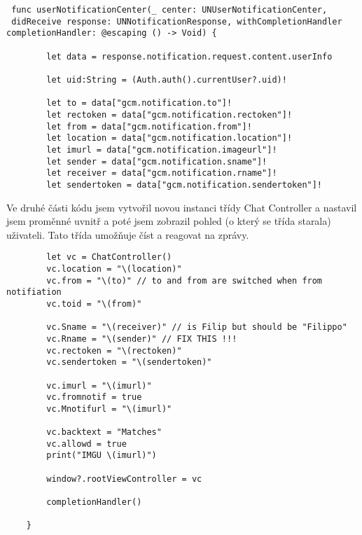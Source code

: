 \documentclass{article}
\begin{document}
\vspace{10 mm}
\begin{verbatim}
 func userNotificationCenter(_ center: UNUserNotificationCenter,
 didReceive response: UNNotificationResponse, withCompletionHandler completionHandler: @escaping () -> Void) {
       
        let data = response.notification.request.content.userInfo
        
        let uid:String = (Auth.auth().currentUser?.uid)!
        
        let to = data["gcm.notification.to"]!
        let rectoken = data["gcm.notification.rectoken"]!
        let from = data["gcm.notification.from"]!
        let location = data["gcm.notification.location"]!
        let imurl = data["gcm.notification.imageurl"]!
        let sender = data["gcm.notification.sname"]!
        let receiver = data["gcm.notification.rname"]!
        let sendertoken = data["gcm.notification.sendertoken"]!
        \end{verbatim}
        
        
        
    \vspace{10 mm}    
Ve druhé části kódu jsem vytvořil novou instanci třídy Chat Controller a nastavil jsem proměnné uvnitř a poté jsem zobrazil pohled (o který se třída starala) uživateli. Tato třída umožňuje číst a reagovat na zprávy.



\vspace{10 mm}
        \begin{verbatim}
        let vc = ChatController()
        vc.location = "\(location)"
        vc.from = "\(to)" // to and from are switched when from notifiation
        vc.toid = "\(from)"
        
        vc.Sname = "\(receiver)" // is Filip but should be "Filippo"
        vc.Rname = "\(sender)" // FIX THIS !!!
        vc.rectoken = "\(rectoken)"
        vc.sendertoken = "\(sendertoken)"
        
        vc.imurl = "\(imurl)"
        vc.fromnotif = true
        vc.Mnotifurl = "\(imurl)"
        
        vc.backtext = "Matches"
        vc.allowd = true
        print("IMGU \(imurl)")
        
        window?.rootViewController = vc
        
        completionHandler()
        
    }


       \end{verbatim}
\end{document}
